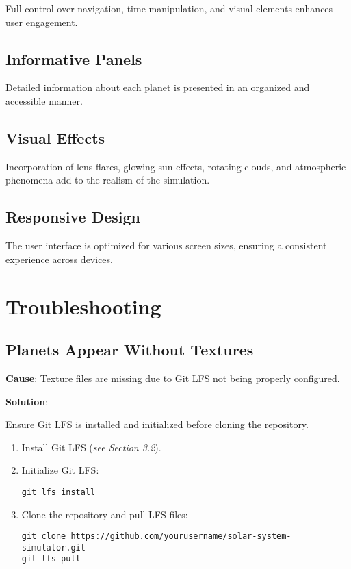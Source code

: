 \documentclass[12pt, a4paper]{article}
\begin{document}
Full control over navigation, time manipulation, and visual elements enhances
user engagement.

\subsection{Informative Panels}

Detailed information about each planet is presented in an organized and
accessible manner.

\subsection{Visual Effects}

Incorporation of lens flares, glowing sun effects, rotating clouds, and
atmospheric phenomena add to the realism of the simulation.

\subsection{Responsive Design}

The user interface is optimized for various screen sizes, ensuring a consistent
experience across devices.

\section{Troubleshooting}

\subsection{Planets Appear Without Textures}

\textbf{Cause}: Texture files are missing due to Git LFS not being properly configured.

\textbf{Solution}:

Ensure Git LFS is installed and initialized before cloning the repository.

\begin{enumerate}
    \item Install Git LFS (\textit{see Section 3.2}).
    \item Initialize Git LFS:

          \begin{verbatim}
git lfs install
    \end{verbatim}

    \item Clone the repository and pull LFS files:

          \begin{verbatim}
git clone https://github.com/yourusername/solar-system-simulator.git
git lfs pull
    \end{verbatim}

\end{enumerate}
\end{document}
